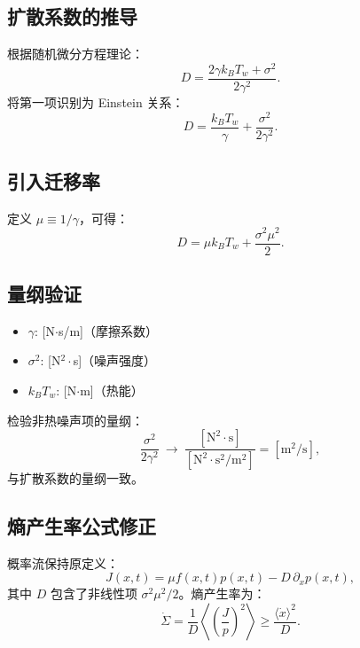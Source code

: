 \documentclass[a4paper,draft]{report}
\begin{document}
\subsection{扩散系数的推导}
根据随机微分方程理论：
\begin{equation}
D = \frac{2\gamma k_B T_w + \sigma^2}{2\gamma^2}.
\end{equation}
将第一项识别为 Einstein 关系：
\begin{equation}
D = \frac{k_B T_w}{\gamma} + \frac{\sigma^2}{2\gamma^2}.
\end{equation}

\subsection{引入迁移率}
定义 $\mu \equiv 1/\gamma$，可得：
\begin{equation}
D = \mu k_B T_w + \frac{\sigma^2 \mu^2}{2}.
\end{equation}

\subsection{量纲验证}
\begin{itemize}
    \item $\gamma$: [N$\cdot$s/m]（摩擦系数）
    \item $\sigma^2$: [N$^{2}\cdot$s]（噪声强度）
    \item $k_B T_w$: [N$\cdot$m]（热能）
\end{itemize}
检验非热噪声项的量纲：
\begin{equation}
\frac{\sigma^2}{2\gamma^2} \ \rightarrow\  \frac{\mathrm{[N^2 \cdot s]}}{\mathrm{[N^2 \cdot s^2 / m^2]}} = \mathrm{[m^2/s]},
\end{equation}
与扩散系数的量纲一致。

\subsection{熵产生率公式修正}
概率流保持原定义：
\begin{equation}
J(x,t) = \mu f(x,t)p(x,t) - D \, \partial_x p(x,t),
\end{equation}
其中 $D$ 包含了非线性项 $\sigma^2 \mu^2 / 2$。熵产生率为：
\begin{equation}
\dot{\Sigma} = \frac{1}{D} \left\langle \left( \frac{J}{p} \right)^2 \right\rangle
\geq \frac{\langle \dot{x} \rangle^2}{D}.
\end{equation}
\end{document}
